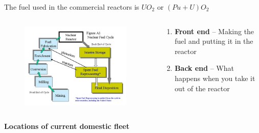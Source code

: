 \documentclass[aspectratio=1610,pdftex,dvipsnames,compress,xcolor={dvipsnames}]{beamer}
\begin{document}
\begin{frame}{The fuel used in the commercial reactors is $UO_2$ or $ (Pu+U)O_2$}
    \begin{columns}[t]

        \begin{column}{0.55\textwidth}
            \begin{figure}
                \centering
                \includegraphics[width=0.95\textwidth]{cycle.components.jpg}
            \end{figure}
        \end{column}

        \begin{column}{0.45\textwidth}
            \begin{enumerate}[series=outerlist,topsep=0pt,itemsep=21pt,leftmargin=*,label=(\arabic*)]
                \item[]\textbf{Front end} -- Making the fuel and putting it in the reactor
                \item[]\textbf{Back end} -- What happens when you take it out of the reactor
            \end{enumerate}
        \end{column}

    \end{columns}
\end{frame}


\begin{frame}[plain]{}
    \centering\LARGE\textbf{Locations of current domestic fleet}
\end{frame}
\end{document}
